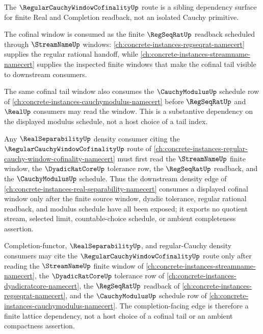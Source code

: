 The $\RegularCauchyWindowCofinalityUp$ route is a sibling dependency surface for finite Real and Completion readback, not an isolated Cauchy primitive.

The cofinal window is consumed as the finite $\RegSeqRatUp$ readback scheduled through $\StreamNameUp$ windows: \autoref{ch:concrete-instances-regseqrat-namecert} supplies the regular rational handoff, while \autoref{ch:concrete-instances-streamname-namecert} supplies the inspected finite windows that make the cofinal tail visible to downstream consumers.

The same cofinal tail window also consumes the $\CauchyModulusUp$ schedule row of \autoref{ch:concrete-instances-cauchymodulus-namecert} before $\RegSeqRatUp$ and $\RealUp$ consumers may read the window. This is a substantive dependency on the displayed modulus schedule, not a host choice of a tail index.

\begin{theorem}
\label{thm:regular-cauchy-window-cofinality-streamname-forward-dependency}
Any $\RealSeparabilityUp$ density consumer citing the $\RegularCauchyWindowCofinalityUp$ route of \autoref{ch:concrete-instances-regular-cauchy-window-cofinality-namecert} must first read the $\StreamNameUp$ finite window, the $\DyadicRatCoreUp$ tolerance row, the $\RegSeqRatUp$ readback, and the $\CauchyModulusUp$ schedule. Thus the downstream density edge of \autoref{ch:concrete-instances-real-separability-namecert} consumes a displayed cofinal window only after the finite source window, dyadic tolerance, regular rational readback, and modulus schedule have all been exposed; it exports no quotient stream, selected limit, countable-choice schedule, or ambient completeness assertion.
\end{theorem}

Completion-functor, $\RealSeparabilityUp$, and regular-Cauchy density consumers may cite the $\RegularCauchyWindowCofinalityUp$ route only after reading the $\StreamNameUp$ finite window of \autoref{ch:concrete-instances-streamname-namecert}, the $\DyadicRatCoreUp$ tolerance row of \autoref{ch:concrete-instances-dyadicratcore-namecert}, the $\RegSeqRatUp$ readback of \autoref{ch:concrete-instances-regseqrat-namecert}, and the $\CauchyModulusUp$ schedule row of \autoref{ch:concrete-instances-cauchymodulus-namecert}. The completion-facing edge is therefore a finite lattice dependency, not a host choice of a cofinal tail or an ambient compactness assertion.
